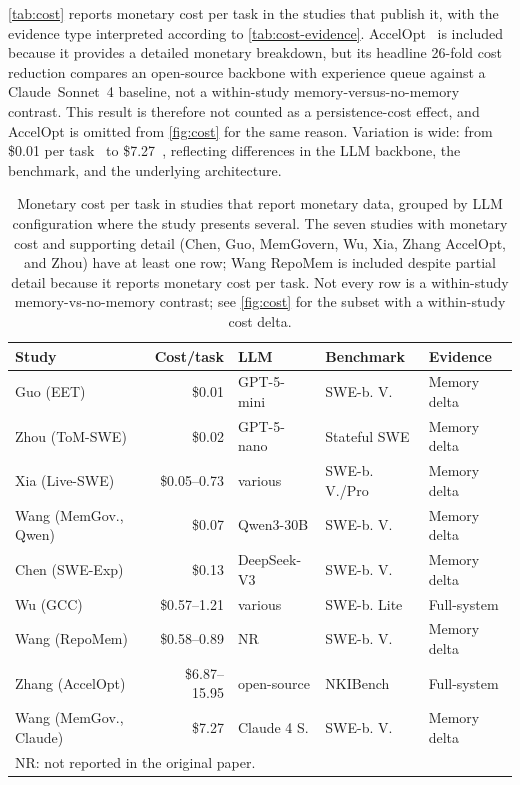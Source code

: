 \autoref{tab:cost} reports monetary cost per task in the studies that
publish it, with the evidence type interpreted according to
\autoref{tab:cost-evidence}.
AccelOpt~\citep{zhang2025accelopt} is included because it provides a
detailed monetary breakdown, but its headline 26-fold cost reduction
compares an open-source backbone with experience queue against a
Claude~Sonnet~4 baseline, not a within-study memory-versus-no-memory
contrast.
This result is therefore not counted as a persistence-cost effect, and
AccelOpt is omitted from \autoref{fig:cost} for the same reason.
Variation is wide: from \$0.01 per
task~\citep{guo2026eet} to \$7.27~\citep{wang2026memgovern},
reflecting differences in the LLM backbone, the benchmark, and the
underlying architecture.

\begin{table}[htbp]
  \centering
  \caption{Monetary cost per task in studies that report monetary data,
    grouped by LLM configuration where the study presents several.
    The seven studies with monetary cost and supporting detail (Chen,
    Guo, MemGovern, Wu, Xia, Zhang AccelOpt, and Zhou) have at least
    one row; Wang RepoMem is included despite partial detail because
    it reports monetary cost per task.
    Not every row is a within-study memory-vs-no-memory contrast; see
    \autoref{fig:cost} for the subset with a within-study cost delta.}
  \label{tab:cost}
  \small
  \setlength{\tabcolsep}{4pt}
  \begin{tabular}{l r l l l}
    \toprule
    Study & Cost/task & LLM & Benchmark & Evidence \\
    \midrule
    Guo (EET) & \$0.01 & GPT-5-mini & SWE-b. V. & Memory delta \\
    Zhou (ToM-SWE) & \$0.02 & GPT-5-nano & Stateful SWE & Memory delta \\
    Xia (Live-SWE) & \$0.05--0.73 & various & SWE-b. V./Pro & Memory delta \\
    Wang (MemGov., Qwen) & \$0.07 & Qwen3-30B & SWE-b. V. & Memory delta \\
    Chen (SWE-Exp) & \$0.13 & DeepSeek-V3 & SWE-b. V. & Memory delta \\
    Wu (GCC) & \$0.57--1.21 & various & SWE-b. Lite & Full-system \\
    Wang (RepoMem) & \$0.58--0.89 & NR & SWE-b. V. & Memory delta \\
    Zhang (AccelOpt) & \$6.87--15.95 & open-source & NKIBench & Full-system \\
    Wang (MemGov., Claude) & \$7.27 & Claude 4 S. & SWE-b. V. & Memory delta \\
    \midrule
    \multicolumn{5}{l}{\footnotesize NR: not reported in the original paper.} \\
    \bottomrule
  \end{tabular}
\end{table}

